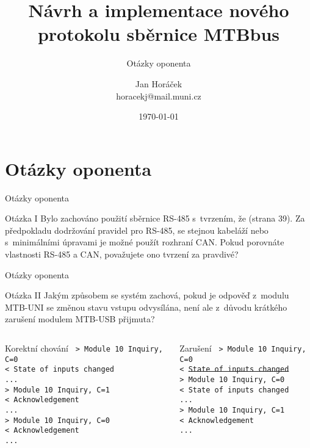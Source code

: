 \documentclass[aspectratio=169]{beamer}
\title[MTB v4]{Návrh a implementace nového protokolu sběrnice MTBbus}
\subtitle[Obhajoba]{Otázky oponenta}
\author[J. Horáček]{Jan Horáček\texorpdfstring{\\}{, }horacekj@mail.muni.cz}
\institute[FI MU]{Fakulta informatiky Masarykovy univerzity}
\date{\today}
\begin{document}

\section{Otázky oponenta}
\begin{frame}{Otázky oponenta}
\begin{alertblock}{Otázka I}
Bylo zachováno použití sběrnice RS-485 s tvrzením, že  (strana 39). Za předpokladu dodržování pravidel pro RS-485, se stejnou
kabeláží nebo s minimálními úpravami je možné použít rozhraní CAN.
Pokud porovnáte vlastnosti RS-485 a CAN, považujete ono tvrzení za pravdivé?
\end{alertblock}
\end{frame}


\begin{frame}{Otázky oponenta}

\begin{alertblock}{Otázka II}
Jakým způsobem se systém zachová, pokud je odpověď z modulu MTB-UNI se změnou
stavu vstupu odvysílána, není ale z důvodu krátkého zarušení modulem MTB-USB
přijmuta?
\end{alertblock}
\pause

\begin{columns}
	\begin{column}{.45\textwidth}
	\begin{exampleblock}{Korektní chování}
	\texttt{\footnotesize
> Module 10 Inquiry, C=0 \\
< State of inputs changed \\
... \\
> Module 10 Inquiry, C=1 \\
< Acknowledgement \\
... \\
> Module 10 Inquiry, C=0 \\
< Acknowledgement \\
...}
	\end{exampleblock}
	\end{column}
	\pause
	\begin{column}{.45\textwidth}
	\begin{exampleblock}{Zarušení}
	\texttt{\footnotesize
> Module 10 Inquiry, C=0 \\
< \st{State of inputs changed} \\
> Module 10 Inquiry, C=0 \\
< State of inputs changed \\
... \\
> Module 10 Inquiry, C=1 \\
< Acknowledgement \\
...}
	\end{exampleblock}
	\end{column}
\end{columns}
\end{frame}

\end{document}
